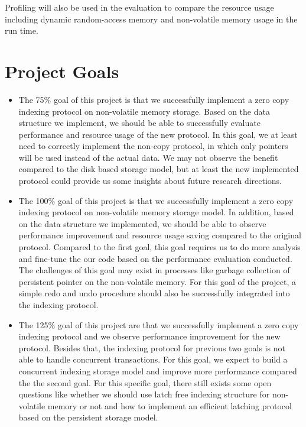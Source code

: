 Profiling will also be used in the evaluation to compare the resource usage including dynamic random-access memory and non-volatile memory usage in the run time. 

\section{Project Goals}
\begin{itemize}
    \item The 75$\%$ goal of this project is that we successfully implement a zero copy indexing protocol on non-volatile memory storage. Based on the data structure we implement, we should be able to successfully evaluate performance and resource usage of the new protocol. In this goal, we at least need to correctly implement the non-copy protocol, in which only pointers will be used instead of the actual data. We may not observe the benefit compared to the disk based storage model, but at least the new implemented protocol could provide us some insights about future research directions.
    \item The 100$\%$ goal of this project is that we successfully implement a zero copy indexing protocol on non-volatile memory storage model. In addition, based on the data structure we implemented, we should be able to observe performance improvement and resource usage saving compared to the original protocol. Compared to the first goal, this goal requires us to do more analysis and fine-tune the our code based on the performance evaluation conducted. The challenges of this goal may exist in processes like garbage collection of persistent pointer on the non-volatile memory. For this goal of the project, a simple redo and undo procedure should also be successfully integrated into the indexing protocol.
    \item The 125$\%$ goal of this project are that we successfully implement a zero copy indexing protocol and we observe performance improvement for the new protocol. Besides that, the indexing protocol for previous two goals is not able to handle concurrent transactions. For this goal, we expect to build a concurrent indexing storage model and improve more performance compared the the second goal. For this specific goal, there still exists some open questions like whether we should use latch free indexing structure for non-volatile memory or not and how to implement an efficient latching protocol based on the persistent storage model.
\end{itemize}
